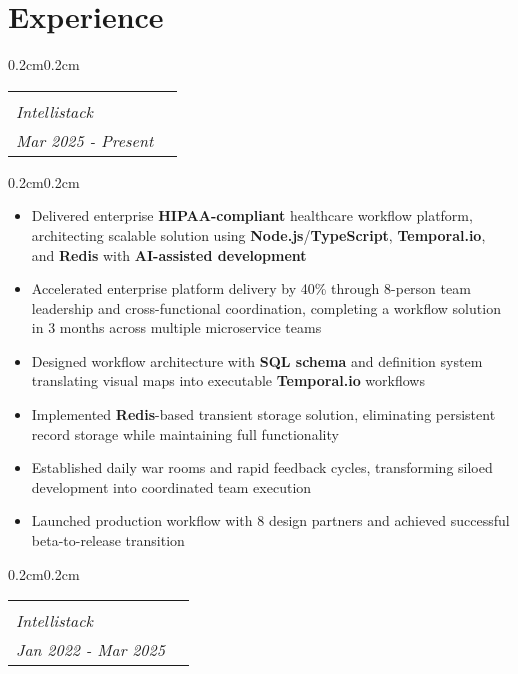 \documentclass[10pt, letterpaper]{article}
\makeatletter
\newenvironment{highlights}{
    \begin{itemize}[
        topsep=0.10 cm,
        parsep=0.10 cm,
        partopsep=0pt,
        itemsep=0pt,
        leftmargin=0.4 cm + 10pt
    ]
}{
    \end{itemize}
}
\newenvironment{onecolentry}{
    \begin{adjustwidth}{0.2cm}{0.2cm}
}{
    \end{adjustwidth}
}
\newcommand{\jobentry}[4]{
    \begin{onecolentry}
        \noindent
        \begin{tabularx}{\textwidth}{@{}X>{\raggedleft\arraybackslash}p{3cm}@{\hspace{0.2cm}}}
            \begin{tabular}[t]{@{}l@{}}
                \textbf{#1}\\
                \textit{#2}
            \end{tabular} &
            \begin{tabular}[t]{@{}r@{}}
                #4\\
                \textit{#3}
            \end{tabular}
        \end{tabularx}
    \end{onecolentry}
}
\makeatother
\begin{document}
    \section{Experience}
    
    \jobentry{Software Architect}{Intellistack}{Mar 2025 - Present}{Remote}

    \vspace{0.10cm}
    \begin{onecolentry}
        \begin{highlights}
            \item Delivered enterprise \textbf{HIPAA-compliant} healthcare workflow platform, architecting scalable solution using \textbf{Node.js}/\textbf{TypeScript}, \textbf{Temporal.io}, and \textbf{Redis} with \textbf{AI-assisted development}
            \item Accelerated enterprise platform delivery by 40\% through 8-person team leadership and cross-functional coordination, completing a workflow solution in 3 months across multiple microservice teams
            \item Designed workflow architecture with \textbf{SQL schema} and definition system translating visual maps into executable \textbf{Temporal.io} workflows
            \item Implemented \textbf{Redis}-based transient storage solution, eliminating persistent record storage while maintaining full functionality
            \item Established daily war rooms and rapid feedback cycles, transforming siloed development into coordinated team execution
            \item Launched production workflow with 8 design partners and achieved successful beta-to-release transition
        \end{highlights}
    \end{onecolentry}
    
    \vspace{0.3cm}
    \jobentry{Principal Engineer}{Intellistack}{Jan 2022 - Mar 2025}{Remote}
\end{document}
